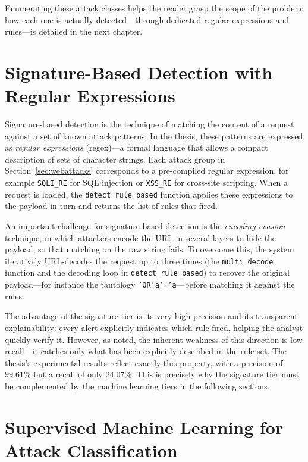 \documentclass[../main.tex]{subfiles}
\begin{document}
Enumerating these attack classes helps the reader grasp the scope of the
problem; how each one is actually detected---through dedicated regular
expressions and rules---is detailed in the next chapter.

\section{Signature-Based Detection with Regular Expressions}
\label{sec:signature}

Signature-based detection is the technique of matching the content of a
request against a set of known attack patterns. In the thesis, these
patterns are expressed as \emph{regular expressions} (regex)---a formal
language that allows a compact description of sets of character strings.
Each attack group in Section~\ref{sec:webattacks} corresponds to a
pre-compiled regular expression, for example \texttt{SQLI\_RE} for SQL
injection or \texttt{XSS\_RE} for cross-site scripting. When a request is
loaded, the \texttt{detect\_rule\_based} function applies these expressions
to the payload in turn and returns the list of rules that fired.

An important challenge for signature-based detection is the \emph{encoding
evasion} technique, in which attackers encode the URL in several layers to
hide the payload, so that matching on the raw string fails. To overcome
this, the system iteratively URL-decodes the request up to three times (the
\texttt{multi\_decode} function and the decoding loop in
\texttt{detect\_rule\_based}) to recover the original payload---for
instance the tautology \texttt{'OR'a'='a}---before matching it against the
rules.

The advantage of the signature tier is its very high precision and its
transparent explainability: every alert explicitly indicates which rule
fired, helping the analyst quickly verify it. However, as noted, the
inherent weakness of this direction is low recall---it catches only what
has been explicitly described in the rule set. The thesis's experimental
results reflect exactly this property, with a precision of $99.61\%$ but a
recall of only $24.07\%$. This is precisely why the signature tier must be
complemented by the machine learning tiers in the following sections.

\section{Supervised Machine Learning for Attack Classification}
\label{sec:sup}
\end{document}
